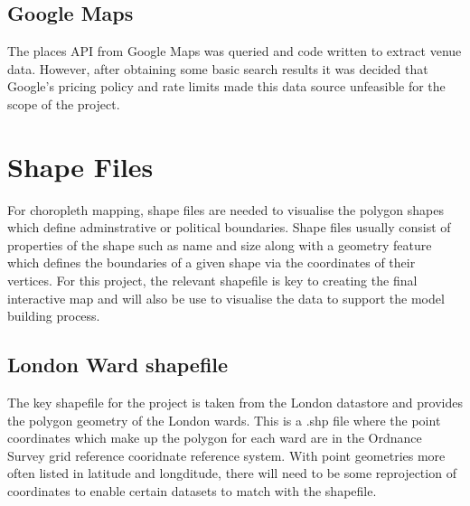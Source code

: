 
\subsection{Google Maps}
The places API from Google Maps was queried and code written to extract venue data. However, after obtaining some basic search results it was decided that Google's pricing policy and rate limits made this data source unfeasible for the scope of the project.


\section{Shape Files}

For choropleth mapping, shape files are needed to visualise the polygon shapes which define adminstrative or political boundaries. Shape files usually consist of properties of the shape such as name and size along with a geometry feature which defines the boundaries of a given shape via the coordinates of their vertices. For this project, the relevant shapefile is key to creating the final interactive map and will also be use to visualise the data to support the model building process.  

\subsection{London Ward shapefile}

The key shapefile for the project is taken from the London datastore and provides the polygon geometry of the London wards. This is a .shp file where the point coordinates which make up the polygon for each ward are in the Ordnance Survey grid reference cooridnate reference system. With point geometries more often listed in latitude and longditude, there will need to be some reprojection of coordinates to enable certain datasets to match with the shapefile.


